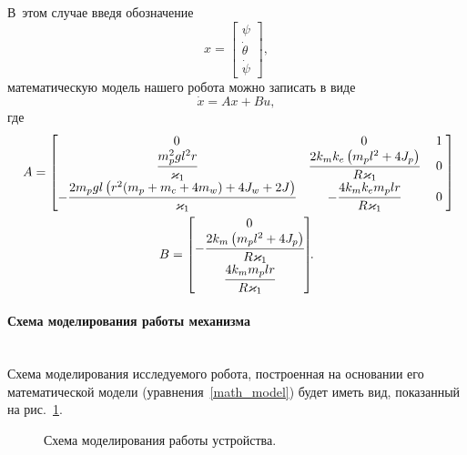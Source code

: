 \documentclass[12pt,a4paper,openany]{extarticle}
\begin{document}
В~этом случае введя обозначение
\begin{equation}
	x =
	\begin{bmatrix}
		\psi \\
		\dot{\theta} \\
		\dot{\psi}
	\end{bmatrix}\!\!,
\end{equation}
математическую модель нашего робота можно записать в виде
\begin{equation}
	\dot x = Ax + Bu,
\end{equation}
где 
\begin{gather}
	A =
	\begin{bmatrix}
		0 & 0 & \phantom{!}1\phantom{!} \\
		\cfrac{m_p^2gl^2r}{\varkappa_1} & \cfrac{2k_mk_e\left(m_pl^2 + 4J_p\right)}{R\varkappa_1}& 0\\
		-\cfrac{2m_pgl\left(r^2(m_p + m_c + 4m_w) + 4J_w + 2J\right)}{\varkappa_1} &
		 -\cfrac{4k_mk_em_plr}{R\varkappa_1} & 0
	\end{bmatrix}\!\!\\
	B = 
	\begin{bmatrix}
		0 \\
		-\cfrac{2k_m\left(m_pl^2 + 4J_p\right)}{R\varkappa_1} \\
		\cfrac{4k_mm_plr}{R\varkappa_1}
	\end{bmatrix}\!\!\ldotp
\end{gather}
\paragraph*{Схема моделирования работы механизма}$\phantom{-}$\\
\hspace*{\parindent}Схема моделирования исследуемого робота, построенная на основании его математической модели (уравнения~\eqref{math_model}) будет иметь вид, показанный на рис.~\ref{struct_sheme}.

\begin{figure}[h]
	\noindent{}
	\caption{Схема моделирования работы устройства.}
	\label{struct_sheme}
\end{figure}
\end{document}
